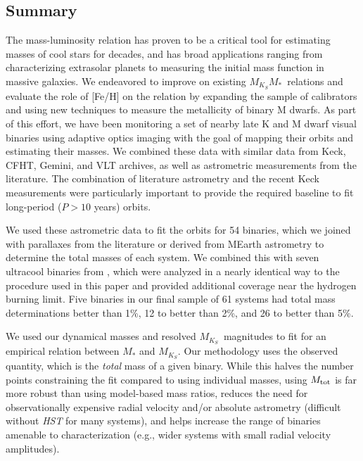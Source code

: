\documentclass[twocolumn]{aastex62}
\newcommand{\mks}{$M_{K_S}$}
\newcommand{\mmk}{$M_{K_S}$\textendash$M_*$}
\begin{document}
\subsection{Summary}

The mass-luminosity relation has proven to be a critical tool for estimating masses of cool stars for decades, and has broad applications ranging from characterizing extrasolar planets to measuring the initial mass function in massive galaxies. We endeavored to improve on existing \mmk\ relations and evaluate the role of [Fe/H] on the relation by expanding the sample of calibrators and using new techniques to measure the metallicity of binary M dwarfs. As part of this effort, we have been monitoring a set of nearby late K and M dwarf visual binaries using adaptive optics imaging with the goal of mapping their orbits and estimating their masses. We combined these data with similar data from Keck, CFHT, Gemini, and VLT archives, as well as astrometric measurements from the literature. The combination of literature astrometry and the recent Keck measurements were particularly important to provide the required baseline to fit long-period ($P>10$ years) orbits. 

We used these astrometric data to fit the orbits for 54 binaries, which we joined with parallaxes from the literature or derived from MEarth astrometry to determine the total masses of each system. We combined this with seven ultracool binaries from \citep{Dupuy2017}, which were analyzed in a nearly identical way to the procedure used in this paper and provided additional coverage near the hydrogen burning limit. Five binaries in our final sample of 61 systems had total mass determinations better than 1\%, 12 to better than 2\%, and 26 to better than 5\%. 

We used our dynamical masses and resolved \mks\ magnitudes to fit for an empirical relation between $M_*$ and \mks. Our methodology uses the observed quantity, which is the {\it total} mass of a given binary. While this halves the number points constraining the fit compared to using individual masses, using $M_{\rm{tot}}$ is far more robust than using model-based mass ratios, reduces the need for observationally expensive radial velocity and/or absolute astrometry (difficult without {\it HST} for many systems), and helps increase the range of binaries amenable to characterization (e.g., wider systems with small radial velocity amplitudes). 
\end{document}
